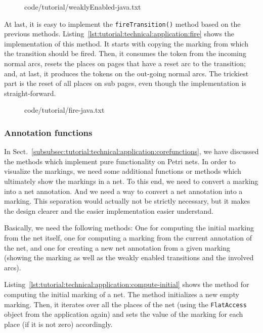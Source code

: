 \begin{figure}[htbp!]
%
  {code/tutorial/weaklyEnabled-java.txt}
\end{figure} 

At last, it is easy to implement the {\tt fireTransition()} method based on the
previous methods.  Listing~\ref{lst:tutorial:technical:application:fire} shows
the implementation of this method. It starts with copying the marking from
which the transition should be fired. Then, it consumes the token from the
incoming normal arcs, resets the places on pages that have a reset arc to
the transition; and, at last, it produces the tokens on the out-going normal
arcs.
The trickiest part is the reset of all places on sub pages, even though the
implementation is straight-forward.

\begin{figure}[htbp!]
%
  {code/tutorial/fire-java.txt}
\end{figure}

\subsubsection{Annotation functions}
\label{subsubsec:tutorial:technical:application:annotationfunctions}

In Sect.~\ref{subsubsec:tutorial:technical:application:corefunctions}, we have
discussed the methods which implement pure functionality on Petri nets. In order
to visualize the markings, we need some additional functions or methods which
ultimately show the markings in a net. To this end, we need to convert a
marking into a net annotation. And we need a way to convert a net annotation
into a marking. This separation would actually not be strictly necessary, but it
makes the design clearer and the easier implementation easier  understand.

Basically, we need the following methods: One for computing the initial marking
from the net itself, one for computing a marking from the current annotation of the net,
and one for creating a new net annotation from a given marking (showing the
marking as well as the weakly enabled transitions and the involved arcs).

Listing~\ref{lst:tutorial:technical:application:compute-initial} shows the
method for computing the initial marking of a net. The method
initializes a new empty marking. Then, it iterates over all the places of
the net (using the {\tt FlatAccess} object from the application again) and sets
the value of the marking for each place (if it is not zero) accordingly.

